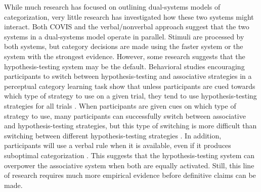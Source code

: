 \documentclass[../dissertation.tex]{subfiles}
\begin{document}
While much research has focused on outlining dual-systems models of categorization, very little research has investigated how these two systems might interact. Both  COVIS and the verbal/nonverbal approach suggest that the two systems in a dual-systems model operate in parallel. Stimuli are processed by both systems, but category decisions are made using the faster system or the system with the strongest evidence. However, some research suggests that the hypothesis-testing system may be the default. Behavioral studies encouraging participants to switch between hypothesis-testing and associative strategies in a perceptual category learning task show that unless participants are cued towards which type of strategy to use on a given trial, they tend to use hypothesis-testing strategies for all trials \citep{Ashby2010, Erickson2008}. When participants are given cues on which type of strategy to use, many participants can successfully switch between associative and hypothesis-testing strategies, but this type of switching is more difficult than switching between different hypothesis-testing strategies \citep{Crossley2018}. In addition, participants will use a verbal rule when it is available, even if it produces suboptimal categorization \citep{Noseworthy2011}. This suggests that the hypothesis-testing system can overpower the associative system when both are equally activated. Still, this line of research requires much more empirical evidence before definitive claims can be made.
\end{document}
